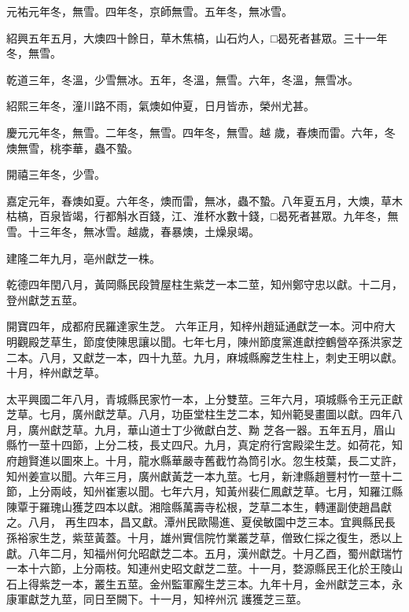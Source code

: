 \begin{pinyinscope}
 元祐元年冬，無雪。四年冬，京師無雪。五年冬，無冰雪。



 紹興五年五月，大燠四十餘日，草木焦槁，山石灼人，□曷死者甚眾。三十一年冬，無雪。



 乾道三年，冬溫，少雪無冰。五年，冬溫，無雪。六年，冬溫，無雪冰。



 紹熙三年冬，潼川路不雨，氣燠如仲夏，日月皆赤，榮州尤甚。



 慶元元年冬，無雪。二年冬，無雪。四年冬，無雪。越
 歲，春燠而雷。六年，冬燠無雪，桃李華，蟲不蟄。



 開禧三年冬，少雪。



 嘉定元年，春燠如夏。六年冬，燠而雷，無冰，蟲不蟄。八年夏五月，大燠，草木枯槁，百泉皆竭，行都斛水百錢，江、淮杯水數十錢，□曷死者甚眾。九年冬，無雪。十三年冬，無冰雪。越歲，春暴燠，土燥泉竭。



 建隆二年九月，亳州獻芝一株。



 乾德四年閏八月，黃岡縣民段贊屋柱生紫芝一本二莖，知州鄭守忠以獻。十二月，登州獻芝五莖。



 開寶四年，成都府民羅達家生芝。
 六年正月，知梓州趙延通獻芝一本。河中府大明觀殿芝草生，節度使陳思讓以聞。七年七月，陳州節度黨進獻控鶴營卒孫洪家芝二本。八月，又獻芝一本，四十九莖。九月，麻城縣廨芝生柱上，刺史王明以獻。十月，梓州獻芝草。



 太平興國二年八月，青城縣民家竹一本，上分雙莖。三年六月，項城縣令王元正獻芝草。七月，廣州獻芝草。八月，功臣堂柱生芝二本，知州範旻畫圖以獻。四年八月，廣州獻芝草。九月，華山道士丁少微獻白芝、黝
 芝各一器。五年五月，眉山縣竹一莖十四節，上分二枝，長丈四尺。九月，真定府行宮殿梁生芝。如荷花，知府趙賢進以圖來上。十月，龍水縣華嚴寺舊截竹為筒引水。忽生枝葉，長二丈許，知州姜宣以聞。六年三月，廣州獻黃芝一本九莖。七月，新津縣趙豐村竹一莖十二節，上分兩岐，知州崔憲以聞。七年六月，知黃州裴仁鳳獻芝草。七月，知羅江縣陳覃于羅瑰山獲芝四本以獻。湘陰縣萬壽寺松根，芝草二本生，轉運副使趙昌獻之。八月，
 再生四本，昌又獻。潭州民歐陽進、夏侯敏園中芝三本。宜興縣民長孫裕家生芝，紫莖黃蓋。十月，雄州實信院竹業叢芝草，僧致仁採之復生，悉以上獻。八年二月，知福州何允昭獻芝二本。五月，漢州獻芝。十月乙酉，蜀州獻瑞竹一本十六節，上分兩枝。知連州史昭文獻芝二莖。十一月，婺源縣民王化於王陵山石上得紫芝一本，叢生五莖。金州監軍廨生芝三本。九年十月，金州獻芝三本，永康軍獻芝九莖，同日至闕下。十一月，知梓州沉
 護獲芝三莖。




\end{pinyinscope}
